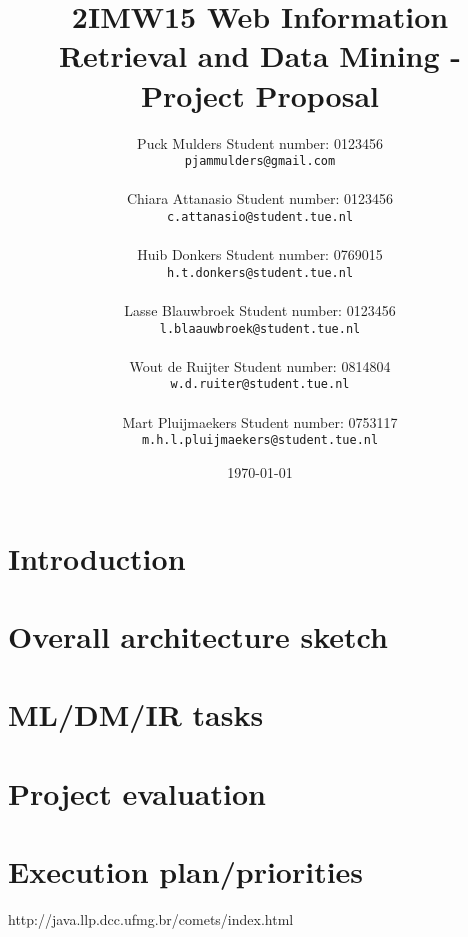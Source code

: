 \documentclass[a4paper,twoside,11pt]{report}
\title{\sffamily\bfseries 2IMW15 Web Information Retrieval and Data Mining - Project Proposal}
\author{
Puck Mulders \qquad Student number: 0123456 \\{\tt pjammulders@gmail.com}\\ \\
Chiara Attanasio \qquad Student number: 0123456 \\{\tt c.attanasio@student.tue.nl}\\ \\
Huib Donkers \qquad Student number: 0769015 \\{\tt h.t.donkers@student.tue.nl}\\ \\
Lasse Blauwbroek \qquad Student number: 0123456 \\{\tt l.blaauwbroek@student.tue.nl}\\ \\
Wout de Ruijter \qquad Student number: 0814804 \\{\tt w.d.ruiter@student.tue.nl}\\ \\
Mart Pluijmaekers \qquad Student number: 0753117 \\{\tt m.h.l.pluijmaekers@student.tue.nl}}
\date{\today}
\begin{document}
\maketitle
\tableofcontents
\newpage

\chapter{Introduction}


\chapter{Overall architecture sketch}



\chapter{ML/DM/IR tasks}



\chapter{Project evaluation}



\chapter{Execution plan/priorities}


\newpage
\begin{thebibliography}{9}
http://java.llp.dcc.ufmg.br/comets/index.html

\end{thebibliography}

\newpage

\begin{appendices}

\end{appendices}
\end{document}
